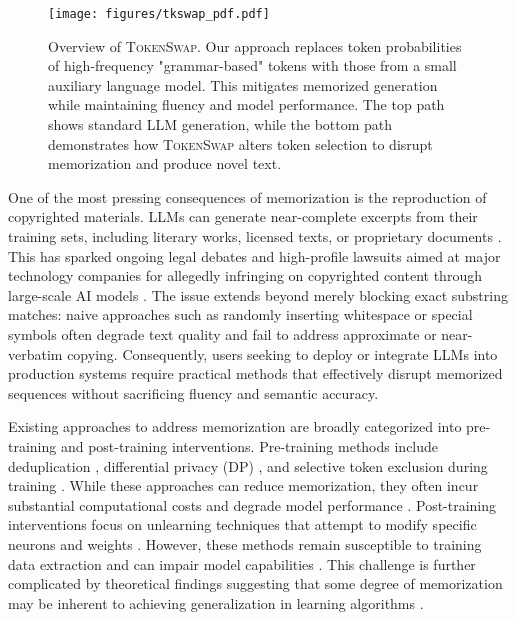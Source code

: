 \begin{figure*}[h]
    \label{fig:overview}
    \centering
    \texttt{[image: figures/tkswap\_pdf.pdf]}
    \caption{Overview of \textsc{TokenSwap}. Our approach replaces token probabilities of high-frequency "grammar-based" tokens with those from a small auxiliary language model. This mitigates memorized generation while maintaining fluency and model performance. The top path shows standard LLM generation, while the bottom path demonstrates how \textsc{TokenSwap} alters token selection to disrupt memorization and produce novel text.}
    \label{fig:tkswap_overview}
\end{figure*}

One of the most pressing consequences of memorization is the
reproduction of copyrighted materials. LLMs can generate near-complete
excerpts from their training sets, including literary works, licensed
texts, or proprietary documents \citep{karamolegkou2023copyright}.
This has sparked ongoing legal debates and high-profile lawsuits
aimed at major technology companies for allegedly infringing on
copyrighted content through large-scale AI models
\citep{grynbaum2023times,panwar2025generative}. The issue extends
beyond merely blocking exact substring matches: naive approaches such
as randomly inserting whitespace or special symbols often degrade text
quality and fail to address approximate or near-verbatim copying.
Consequently, users seeking to deploy or integrate LLMs into
production systems require practical methods that effectively disrupt
memorized sequences without sacrificing fluency and semantic accuracy.


Existing approaches to address memorization are broadly categorized into pre-training and post-training interventions. Pre-training methods include deduplication \citep{kandpal2022deduplicating}, differential privacy (DP) \citep{abadi2016deep}, and selective token exclusion during training \citep{hans2024like}. While these approaches can reduce memorization, they often incur substantial computational costs and degrade model performance \citep{Anil2021}. Post-training interventions focus on unlearning techniques that attempt to modify specific neurons and weights \citep{maini2023can, sakarvadia2024mitigating}. However, these methods remain susceptible to training data extraction \citep{shumailov2024ununlearning} and can impair model capabilities \citep{huang2024demystifyingverbatimmemorizationlarge}. This challenge is further complicated by theoretical findings suggesting that some degree of memorization may be inherent to achieving generalization in learning algorithms \citep{attias2024information}.

